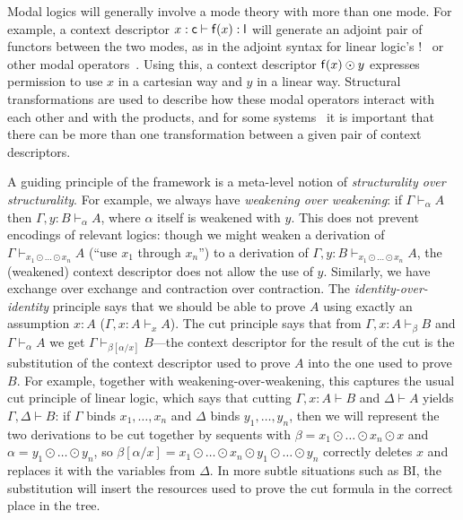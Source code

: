 \documentclass[a4paper,USenglish]{lipics-v2016}
\newcommand\seq[3]{\ensuremath{#1 \vdash_{#2} #3}}
\renewcommand\subst[3]{\ensuremath{#1[#2/#3]}}
\newcommand\citep[1]{\cite{#1}}
\begin{document}
Modal logics will generally involve a mode theory with more than one
mode.  For example, a context descriptor $x : \mathsf{c} \vdash \mathsf{f}(x)
: \mathsf{l}$ will generate an adjoint pair of functors between the two
modes, as in the adjoint syntax for linear logic's
$!$~\citep{bentonwadler96adjoint} or other modal
operators~\citep{reed09adjoint}.  Using this, a context descriptor
$\mathsf{f}(x) \odot y$ expresses permission to use $x$ in a cartesian way
and $y$ in a linear way.  Structural transformations are used to
describe how these modal operators interact with each other and with the
products, and for some systems~\citep{ls16adjoint} it is important that
there can be more than one transformation between a given pair of
context descriptors.

A guiding principle of the framework is a meta-level notion of
\emph{structurality over structurality}.  For example, we always have
\emph{weakening over weakening}: if \seq{\Gamma}{\alpha}{A} then
\seq{\Gamma,y:B}{\alpha}{A}, where $\alpha$ itself is weakened with $y$.
This does not prevent encodings of relevant logics: though we might
weaken a derivation of \seq{\Gamma}{x_1 \odot \ldots \odot x_n}{A}
(``use $x_1$ through $x_n$'') to a derivation of \seq{\Gamma,y:B}{x_1
  \odot \ldots \odot x_n}{A}, the (weakened) context descriptor
does not allow the use of $y$.  Similarly, we have exchange over
exchange and contraction over contraction.  The \emph{identity-over-identity}
principle says that we should be able to prove $A$ using exactly an
assumption $x:A$ ({\seq{\Gamma,x:A}{x}{A}}).  The cut principle says
that from \seq{\Gamma,x:A}{\beta}{B} and \seq{\Gamma}{\alpha}{A} we get
{\seq{\Gamma}{\subst{\beta}{\alpha}{x}}{B}}---the context descriptor for
the result of the cut is the substitution of the context descriptor used
to prove $A$ into the one used to prove $B$.  For example, together with
weakening-over-weakening, this captures the usual cut principle of
linear logic, which says that cutting $\Gamma,x:A \vdash B$ and $\Delta
\vdash A$ yields $\Gamma,\Delta \vdash B$: if $\Gamma$ binds
$x_1,\ldots,x_n$ and $\Delta$ binds $y_1,\ldots,y_n$, then we will
represent the two derivations to be cut together by sequents with $\beta
= x_1 \odot \ldots \odot x_n \odot x$ and $\alpha = y_1 \odot \ldots
\odot y_n$, so $\beta[\alpha/x] = x_1 \odot \ldots \odot x_n \odot y_1
\odot \ldots \odot y_n$ correctly deletes $x$ and replaces it with the
variables from $\Delta$.  In more subtle situations such as BI, the
substitution will insert the resources used to prove the cut formula in
the correct place in the tree.
\end{document}
